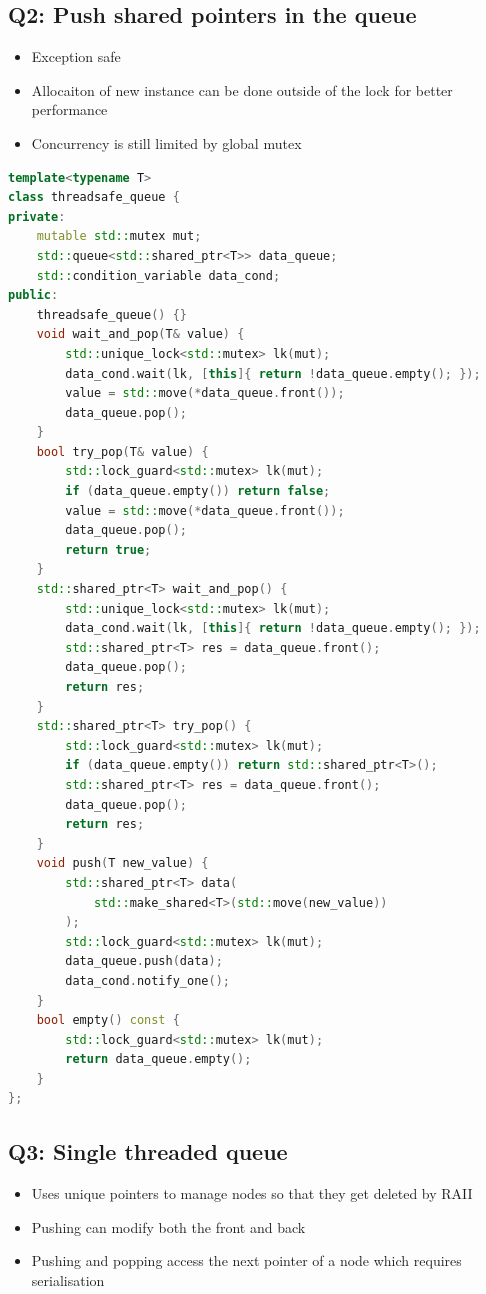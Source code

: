 \documentclass{article}
\begin{document}
\subsection{Q2: Push shared pointers in the queue}
\begin{itemize}
    \item Exception safe
    \item Allocaiton of new instance can be done outside of the lock for better performance
    \item Concurrency is still limited by global mutex
\end{itemize}

\begin{lstlisting}[language=C++]
template<typename T>
class threadsafe_queue {
private:
    mutable std::mutex mut;
    std::queue<std::shared_ptr<T>> data_queue;
    std::condition_variable data_cond;
public:
    threadsafe_queue() {}
    void wait_and_pop(T& value) {
        std::unique_lock<std::mutex> lk(mut);
        data_cond.wait(lk, [this]{ return !data_queue.empty(); });
        value = std::move(*data_queue.front());
        data_queue.pop();
    }
    bool try_pop(T& value) {
        std::lock_guard<std::mutex> lk(mut);
        if (data_queue.empty()) return false;
        value = std::move(*data_queue.front());
        data_queue.pop();
        return true;
    }
    std::shared_ptr<T> wait_and_pop() {
        std::unique_lock<std::mutex> lk(mut);
        data_cond.wait(lk, [this]{ return !data_queue.empty(); });
        std::shared_ptr<T> res = data_queue.front();
        data_queue.pop();
        return res;
    }
    std::shared_ptr<T> try_pop() {
        std::lock_guard<std::mutex> lk(mut);
        if (data_queue.empty()) return std::shared_ptr<T>();
        std::shared_ptr<T> res = data_queue.front();
        data_queue.pop();
        return res;
    }
    void push(T new_value) {
        std::shared_ptr<T> data(
            std::make_shared<T>(std::move(new_value))
        );
        std::lock_guard<std::mutex> lk(mut);
        data_queue.push(data);
        data_cond.notify_one();
    }
    bool empty() const {
        std::lock_guard<std::mutex> lk(mut);
        return data_queue.empty();
    }
};
\end{lstlisting}

\subsection{Q3: Single threaded queue}
\begin{itemize}
    \item Uses unique pointers to manage nodes so that they get deleted by RAII
    \item Pushing can modify both the front and back
    \item Pushing and popping access the next pointer of a node which requires serialisation
\end{itemize}
\end{document}

